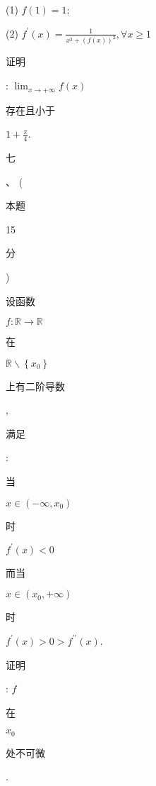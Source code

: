 \documentclass[10pt]{article}
\begin{document}
(1) $f(1)=1$;

(2) $f^{\prime}(x)=\frac{1}{x^{2}+(f(x))^{2}}, \forall x \geqslant 1$

\begin{CJK}{UTF8}{mj}证明\end{CJK}: $\lim _{x \rightarrow+\infty} f(x)$ \begin{CJK}{UTF8}{mj}存在且小于\end{CJK} $1+\frac{\pi}{4}$.

\begin{CJK}{UTF8}{mj}七\end{CJK}、 (\begin{CJK}{UTF8}{mj}本题\end{CJK} 15 \begin{CJK}{UTF8}{mj}分\end{CJK}) \begin{CJK}{UTF8}{mj}设函数\end{CJK} $f: \mathbb{R} \rightarrow \mathbb{R}$ \begin{CJK}{UTF8}{mj}在\end{CJK} $\mathbb{R} \backslash\left\{x_{0}\right\}$ \begin{CJK}{UTF8}{mj}上有二阶导数\end{CJK}, \begin{CJK}{UTF8}{mj}满足\end{CJK}: \begin{CJK}{UTF8}{mj}当\end{CJK} $x \in\left(-\infty, x_{0}\right)$ \begin{CJK}{UTF8}{mj}时\end{CJK} $f^{\prime}(x)<0$ \begin{CJK}{UTF8}{mj}而当\end{CJK} $x \in\left(x_{0},+\infty\right)$ \begin{CJK}{UTF8}{mj}时\end{CJK} $f^{\prime}(x)>0>f^{\prime \prime}(x)$. \begin{CJK}{UTF8}{mj}证明\end{CJK}: $f$ \begin{CJK}{UTF8}{mj}在\end{CJK} $x_{0}$ \begin{CJK}{UTF8}{mj}处不可微\end{CJK}.
\end{document}

